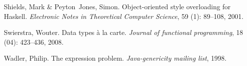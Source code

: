 \documentclass[runningheads,a4paper]{llncs}
\begin{document}
\begin{thebibliography}{4}
Shields, Mark \& Peyton~Jones, Simon.
\newblock Object-oriented style overloading for Haskell.
\newblock \emph{Electronic Notes in Theoretical Computer Science}, 59
  (1): 89--108, 2001.

Swierstra, Wouter.
\newblock Data types {\`a} la carte.
\newblock \emph{Journal of functional programming}, 18 (04):
  423--436, 2008.

Wadler, Philip.
\newblock The expression problem.
\newblock \emph{Java-genericity mailing list}, 1998.







\end{thebibliography}
\end{document}
